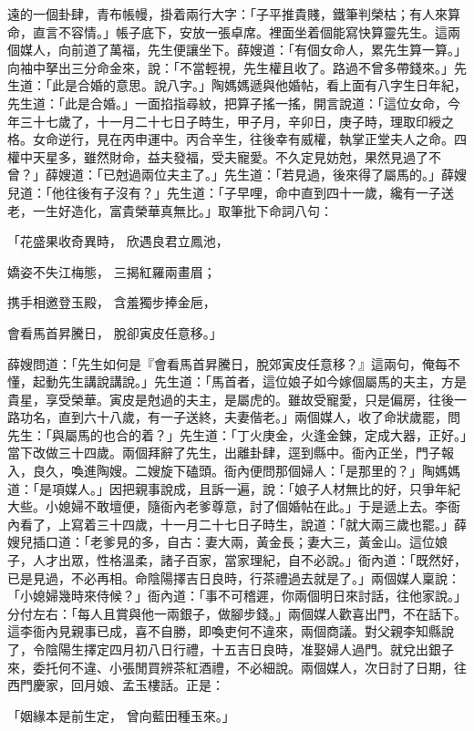 \begin{showcontents}{}
遠的一個卦肆，青布帳幔，掛着兩行大字：「子平推貴賤，鐵筆判榮枯；有人來算命，直言不容情。」帳子底下，安放一張卓席。裡面坐着個能寫快算靈先生。這兩個媒人，向前道了萬福，先生便讓坐下。薛嫂道：「有個女命人，累先生算一算。」向袖中拏出三分命金來，說：「不當輕視，先生權且收了。路過不曾多帶錢來。」先生道：「此是合婚的意思。說八字。」陶媽媽遞與他婚帖，看上面有八字生日年紀，先生道：「此是合婚。」一面掐指尋紋，把算子搖一搖，開言說道：「這位女命，今年三十七歲了，十一月二十七日子時生，甲子月，辛卯日，庚子時，理取印綬之格。女命逆行，見在丙申運中。丙合辛生，往後幸有威權，執掌正堂夫人之命。四權中天星多，雖然財命，益夫發福，受夫寵愛。不久定見妨尅，果然見過了不曾？」薛嫂道：「已尅過兩位夫主了。」先生道：「若見過，後來得了屬馬的。」薛嫂兒道：「他往後有子沒有？」先生道：「子早哩，命中直到四十一歲，纔有一子送老，一生好造化，富貴榮華真無比。」取筆批下命詞八句：

「花盛果收奇異時，  欣遇良君立鳳池，

嬌姿不失江梅態，  三揭紅羅兩畫眉；

携手相邀登玉殿，  含羞獨步捧金巵，

會看馬首昇騰日，  脫卻寅皮任意移。」

薛嫂問道：「先生如何是『會看馬首昇騰日，脫郊寅皮任意移？』這兩句，俺每不懂，起動先生講說講說。」先生道：「馬首者，這位娘子如今嫁個屬馬的夫主，方是貴星，享受榮華。寅皮是尅過的夫主，是屬虎的。雖故受寵愛，只是偏房，往後一路功名，直到六十八歲，有一子送終，夫妻偕老。」兩個媒人，收了命狀歲罷，問先生：「與屬馬的也合的着？」先生道：「丁火庚金，火逢金鍊，定成大器，正好。」當下改做三十四歲。兩個拜辭了先生，出離卦肆，逕到縣中。衙內正坐，門子報入，良久，喚進陶嫂。二嫂旋下磕頭。衙內便問那個婦人：「是那里的？」陶媽媽道：「是項媒人。」因把親事說成，且訴一遍，說：「娘子人材無比的好，只爭年紀大些。小媳婦不敢壇便，隨衙內老爹尊意，討了個婚帖在此。」于是遞上去。李衙內看了，上寫着三十四歲，十一月二十七日子時生，說道：「就大兩三歲也罷。」薛嫂兒插口道：「老爹見的多，自古：妻大兩，黃金長；妻大三，黃金山。這位娘子，人才出眾，性格溫柔，諸子百家，當家理紀，自不必說。」衙內道：「既然好，已是見過，不必再相。命陰陽擇吉日良時，行茶禮過去就是了。」兩個媒人稟說：「小媳婦幾時來侍候？」衙內道：「事不可稽遲，你兩個明日來討話，往他家說。」分付左右：「每人且賞與他一兩銀子，做腳步錢。」兩個媒人歡喜出門，不在話下。這李衙內見親事已成，喜不自勝，即喚吏何不違來，兩個商議。對父親李知縣說了，令陰陽生擇定四月初八日行禮，十五吉日良時，准娶婦人過門。就兌出銀子來，委托何不違、小張閒買辨茶紅酒禮，不必細說。兩個媒人，次日討了日期，往西門慶家，回月娘、孟玉樓話。正是：

「姻緣本是前生定，  曾向藍田種玉來。」


\end{showcontents}
